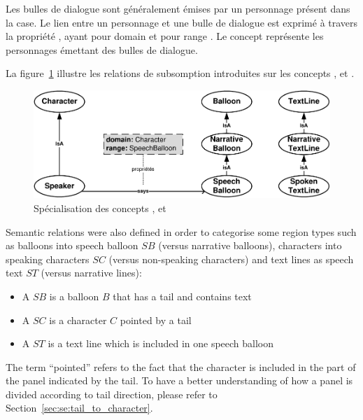 Les bulles de dialogue sont généralement émises par un personnage présent dans la case.
Le lien entre un personnage et une bulle de dialogue est exprimé à travers la propriété , ayant pour domain  et pour range .
Le concept  représente les personnages émettant des bulles de dialogue.


La figure~\ref{fig:model_d_3} illustre les relations de subsomption introduites sur les concepts ,  et .\\

\begin{figure}[h!]
\begin{center}
\includegraphics[width=1\textwidth]{model_step2ter_new.pdf}
\caption{Spécialisation des concepts ,  et }
\label{fig:model_d_3}
\end{center}
\end{figure}


Semantic relations were also defined in order to categorise some region types such as balloons into speech balloon $SB$ (versus narrative balloons), characters into speaking characters $SC$ (versus non-speaking characters) and text lines as speech text $ST$ (versus narrative lines):
\begin{itemize}
  \item A $SB$ is a balloon $B$ that has a tail and contains text
  \item A $SC$ is a character $C$ pointed by a tail
  \item A $ST$ is a text line which is included in one speech balloon
\end{itemize}

The term ``pointed'' refers to the fact that the character is included in the part of the panel indicated by the tail. To have a better understanding of how a panel is divided according to tail direction, please refer to Section~\ref{sec:se:tail_to_character}.

